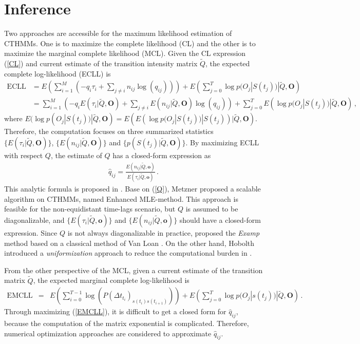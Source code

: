 \documentclass{article}
\begin{document}
\section{Inference}
Two approaches are accessible for the maximum likelihood estimation of CTHMMs. One is to maximize the complete likelihood (CL) and the other is to maximize the marginal complete likelihood (MCL). Given the CL expression (\ref{CL}) and current estimate of the transition intensity matrix $\tilde{Q}$, the expected complete log-likelihood (ECLL) is 
\begin{align}
\mathrm{ECLL} & = E\left(\sum_{i = 1}^{M} \left( -q_i\tau_i + \sum_{j \neq i} n_{ij}\log(q_{ij}) \right)\right) + E\left( \sum_{j = 0}^{T} \log p(O_j|S(t_j)) | \tilde{Q}, \bm O \right) \nonumber \\
& = \sum_{i = 1}^{M}\left( -q_iE(\tau_i |\tilde{Q}, \bm O) + \sum_{j \neq i} E(n_{ij} | \tilde{Q}, \bm O)\log(q_{ij}) \right) + \sum_{j = 0}^{T} E\left(\log p(O_j|S(t_j))| \tilde{Q}, \bm O\right)\,, \nonumber
\end{align}
where $E(\log p(O_j|S(t_j))| \tilde{Q}, \bm O) = E(E\left(\log p(O_j|S(t_j))| S(t_j)\right)| \tilde{Q}, \bm O)$. Therefore, the computation focuses on three summarized statistics $\{E(\tau_i |\tilde{Q}, \bm O)\}$, $\{E(n_{ij} | \tilde{Q}, \bm O)\}$ and $\{p(S(t_j)| \tilde{Q}, \bm O)\}$. By maximizing ECLL with respect $Q$, the estimate of $Q$ has a closed-form expression as
\begin{eqnarray}
\hat{q}_{ij} = \frac{E(n_{ij} | \tilde{Q}, \bm o)}{E(\tau_i |\tilde{Q}, \bm o)}\,.
\label{Q}
\end{eqnarray} 
This analytic formula is proposed in \cite{Mogens_2005}. Base on (\ref{Q}), Metzner \cite{Metzner_2007} proposed a scalable algorithm on CTHMMs, named Enhanced MLE-method. This approach is feasible for the non-equidistant time-lags scenario, but $Q$ is assumed to be diagonalizable, and $\{E(\tau_i |\tilde{Q}, \bm o)\}$ and $\{E(n_{ij} | \tilde{Q}, \bm o)\}$ should have a closed-form expression. Since $Q$ is not always diagonalizable in practice, \cite{Liu_2015} proposed the \textit{Examp} method based on a classical method of Van Loan \cite{Loan_1978}. On the other hand, Hobolth introduced a \textit{uniformization} approach to reduce the computational burden in \cite{Hobolth_2011}.

From the other perspective of the MCL, given a current estimate of the transition matrix $\tilde{Q}$, the expected marginal complete log-likelihood is 
\begin{eqnarray}
\mathrm{EMCLL} & = & E\left(\sum_{i = 0}^{T-1}\log(P(\Delta t_{t_i})_{s(t_i)s(t_{i+1})})\right) + E\left( \sum_{j = 0}^{T}\log p(O_j|s(t_j)) | \tilde{Q}, \bm O \right)\,.
\label{EMCLL}
\end{eqnarray}
Through maximizing (\ref{EMCLL}), it is difficult to get a closed form for $\hat{q}_{ij}$, because the computation of the matrix exponential is complicated. Therefore, numerical optimization approaches are considered to approximate $\hat{q}_{ij}$.
\end{document}
